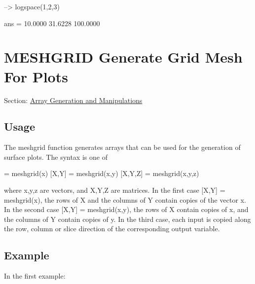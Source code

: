 \begin{DoxyVerbInclude}
--> logspace(1,2,3)

ans = 
   10.0000   31.6228  100.0000 
\end{DoxyVerbInclude}
 \hypertarget{array_meshgrid}{}\section{M\-E\-S\-H\-G\-R\-I\-D Generate Grid Mesh For Plots}\label{array_meshgrid}
Section\-: \hyperlink{sec_array}{Array Generation and Manipulations} \hypertarget{vtkwidgets_vtkxyplotwidget_Usage}{}\subsection{Usage}\label{vtkwidgets_vtkxyplotwidget_Usage}
The {\ttfamily meshgrid} function generates arrays that can be used for the generation of surface plots. The syntax is one of \begin{DoxyVerb}  [X,Y] = meshgrid(x)
  [X,Y] = meshgrid(x,y)
  [X,Y,Z] = meshgrid(x,y,z)
\end{DoxyVerb}
 where {\ttfamily x,y,z} are vectors, and {\ttfamily X,Y,Z} are matrices. In the first case {\ttfamily \mbox{[}X,Y\mbox{]} = meshgrid(x)}, the rows of {\ttfamily X} and the columns of {\ttfamily Y} contain copies of the vector {\ttfamily x}. In the second case {\ttfamily \mbox{[}X,Y\mbox{]} = meshgrid(x,y)}, the rows of {\ttfamily X} contain copies of {\ttfamily x}, and the columns of {\ttfamily Y} contain copies of {\ttfamily y}. In the third case, each input is copied along the row, column or slice direction of the corresponding output variable. \hypertarget{variables_struct_Example}{}\subsection{Example}\label{variables_struct_Example}
In the first example\-:


